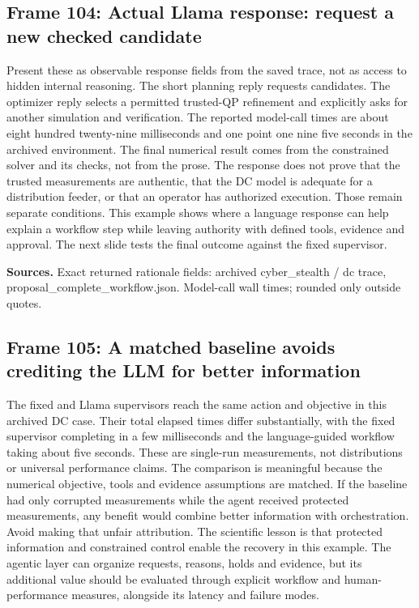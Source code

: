 \documentclass[11pt]{article}
\begin{document}
\subsection*{Frame 104: Actual Llama response: request a new checked candidate}
Present these as observable response fields from the saved trace, not as access to hidden internal reasoning. The short planning reply requests candidates. The optimizer reply selects a permitted trusted-QP refinement and explicitly asks for another simulation and verification. The reported model-call times are about eight hundred twenty-nine milliseconds and one point one nine five seconds in the archived environment. The final numerical result comes from the constrained solver and its checks, not from the prose. The response does not prove that the trusted measurements are authentic, that the DC model is adequate for a distribution feeder, or that an operator has authorized execution. Those remain separate conditions. This example shows where a language response can help explain a workflow step while leaving authority with defined tools, evidence and approval. The next slide tests the final outcome against the fixed supervisor.\par
\par\nopagebreak\begin{minipage}{\linewidth}{\footnotesize\color{slate}\textbf{Sources.} Exact returned rationale fields: archived cyber\_stealth / dc trace, proposal\_complete\_workflow.json. Model-call wall times; rounded only outside quotes.\par}\end{minipage}\par\medskip
\subsection*{Frame 105: A matched baseline avoids crediting the LLM for better information}
The fixed and Llama supervisors reach the same action and objective in this archived DC case. Their total elapsed times differ substantially, with the fixed supervisor completing in a few milliseconds and the language-guided workflow taking about five seconds. These are single-run measurements, not distributions or universal performance claims. The comparison is meaningful because the numerical objective, tools and evidence assumptions are matched. If the baseline had only corrupted measurements while the agent received protected measurements, any benefit would combine better information with orchestration. Avoid making that unfair attribution. The scientific lesson is that protected information and constrained control enable the recovery in this example. The agentic layer can organize requests, reasons, holds and evidence, but its additional value should be evaluated through explicit workflow and human-performance measures, alongside its latency and failure modes.\par
\end{document}
